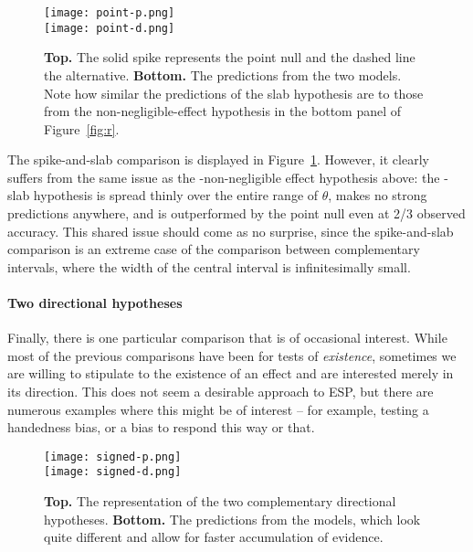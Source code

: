 \begin{figure}[tb]
\texttt{[image: point-p.png]}\\
\texttt{[image: point-d.png]}
\caption{\textbf{Top.} The solid spike represents the point null and the dashed line the alternative. \textbf{Bottom.} The predictions from the two models. Note how similar the predictions of the slab hypothesis are to those from the non-negligible-effect hypothesis in the bottom panel of Figure~\ref{fig:r}.}\label{fig:p}
\end{figure}

The spike-and-slab comparison is displayed in Figure~\ref{fig:p}. However, it clearly suffers from the same issue as the \hyp{non-negligible effect hypothesis}  above: the \hyp{slab hypothesis} is spread thinly over the entire range of $\theta$, makes no strong predictions anywhere, and is outperformed by the point null even at 2/3 observed accuracy.  This shared issue should come as no surprise, since the spike-and-slab comparison is an extreme case of the comparison between complementary intervals, where the width of the central interval is infinitesimally small.


\paragraph{Two directional hypotheses}
Finally, there is one particular comparison that is of occasional interest.  While most of the previous comparisons have been for tests of \emph{existence}, sometimes we are willing to stipulate to the existence of an effect and are interested merely in its direction.  This does not seem a desirable approach to ESP, but there are numerous examples where this might be of interest -- for example, testing a handedness bias, or a bias to respond this way or that.

\begin{figure}[tb]
\texttt{[image: signed-p.png]}\\
\texttt{[image: signed-d.png]}
\caption{\textbf{Top.} The representation of the two complementary directional hypotheses. \textbf{Bottom.} The predictions from the models, which look quite different and allow for faster accumulation of evidence.}\label{fig:s}
\end{figure}

